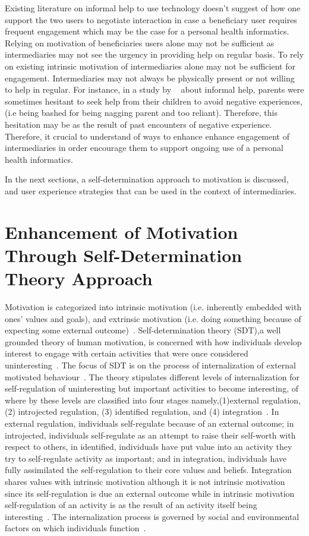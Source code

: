 Existing literature on informal help to use technology doesn't suggest of how one support the two users to negotiate interaction in case a beneficiary user requires frequent engagement which may be the case for a personal health informatics. Relying on motivation of beneficiaries users alone may not be sufficient as intermediaries may not see the urgency in providing help on regular basis. To rely on existing intrinsic motivation of intermediaries alone may not be sufficient for engagement. Intermediaries may not always be physically present or not willing to help in regular. For instance, in a study by ~\cite{kiesler:twi} about informal help, parents were sometimes hesitant to seek help from their children to avoid negative experiences, (i.e being bashed for being nagging parent and too reliant). Therefore, this hesitation may be as the result of past encounters of negative experience. Therefore, it crucial to understand of ways to enhance enhance engagement of intermediaries in order encourage them to support ongoing use of a personal health informatics.

In the next sections, a self-determination approach to motivation is discussed, and user experience strategies that can be used in the context of intermediaries. 
\section{Enhancement of Motivation Through Self-Determination Theory Approach}
Motivation is categorized into intrinsic motivation (i.e. inherently embedded with ones' values and goals), and extrinsic motivation (i.e. doing something because of expecting some external outcome)~\citep{ryan2000intrinsic}. Self-determination theory (SDT)\citep{deci1985:intrinsic},a well grounded theory of human motivation, is concerned with how individuals develop interest to engage with certain activities that were once considered uninteresting~\citep{ryan2000intrinsic}. The focus of SDT is on the process of internalization of external motivated behaviour~\citep{ryan2000intrinsic}. The theory stipulates different levels of internalization for self-regulation of uninteresting but important activities to become interesting, of where by these levels are classified into four stages namely,(1)external regulation, (2) introjected regulation, (3) identified regulation, and (4) integration~\citep{ryan2000intrinsic}. In external regulation, individuals self-regulate because of an external outcome; in introjected, individuals self-regulate as an attempt to raise their self-worth with respect to others, in identified, individuals have put value into an activity they try to self-regulate activity as important; and in integration, individuals have fully assimilated the self-regulation to their core values and beliefs.  Integration shares values with intrinsic motivation although it is not intrinsic motivation since its self-regulation is due an external outcome while in intrinsic motivation self-regulation of an activity is as the result of an activity itself being interesting~\citep{ryan2000intrinsic}. The internalization process is governed by social and environmental factors on which individuals function~\citep{ryan2000:self,lee2015:relating}.

